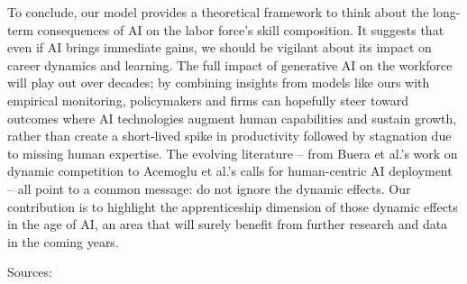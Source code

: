 \documentclass[12pt]{article}
\begin{document}
To conclude, our model provides a theoretical framework to think about
the {long-term consequences of AI on the labor force's skill
composition}. It suggests that even if AI brings immediate gains, we
should be vigilant about its impact on {career dynamics and
learning}. The full impact of generative AI on the workforce will play
out over decades; by combining insights from models like ours with
empirical monitoring, policymakers and firms can hopefully steer toward
outcomes where AI technologies {augment} human capabilities and
sustain growth, rather than create a short-lived spike in productivity
followed by stagnation due to missing human expertise. The evolving
literature -- from Buera et al.'s work on dynamic competition to
Acemoglu et al.'s calls for human-centric AI deployment -- all point to
a common message: {do not ignore the dynamic effects}. Our
contribution is to highlight the apprenticeship dimension of those
dynamic effects in the age of AI, an area that will surely benefit from
further research and data in the coming years.

{Sources:}
\end{document}
